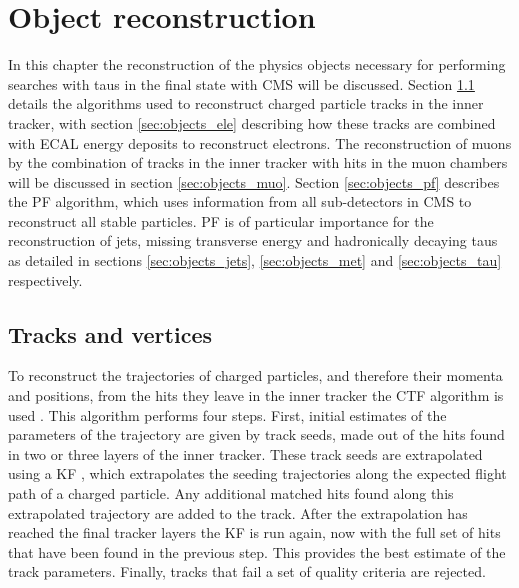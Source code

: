 \chapter{Object reconstruction}
\label{chap:objects}

In this chapter the reconstruction of the physics objects necessary for performing searches with taus 
in the final state with \ac{CMS} will be discussed. Section \ref{sec:objects_pv} details the algorithms
used to reconstruct charged particle tracks in the inner tracker, with section \ref{sec:objects_ele}
describing how these tracks are combined with \ac{ECAL} energy deposits to reconstruct electrons.
The reconstruction of muons by the combination of tracks in the inner tracker with hits in the muon 
chambers will be discussed in section \ref{sec:objects_muo}.
Section \ref{sec:objects_pf}
describes the \ac{PF} algorithm, which uses information from all sub-detectors in \ac{CMS} to reconstruct
all stable particles. \ac{PF} is of particular importance for the reconstruction of jets, missing transverse
energy and hadronically decaying taus as detailed in sections \ref{sec:objects_jets}, \ref{sec:objects_met} and \ref{sec:objects_tau} 
respectively.

\section{Tracks and vertices}
\label{sec:objects_pv}
To reconstruct the trajectories of charged particles, and therefore
their momenta and positions, from the hits they leave in the 
inner tracker the
\ac{CTF} algorithm is used \cite{cms-trk-algos}. This algorithm performs four steps.
First, initial estimates of the parameters of the trajectory are given by track seeds, 
made out of the hits found in two or three layers of the inner tracker. These track seeds
are extrapolated using a \ac{KF} \cite{trk-kf}, which extrapolates the seeding
trajectories along the expected flight path of a charged particle. Any additional
matched hits found along this extrapolated trajectory are added to the track.
After the extrapolation has reached the final tracker layers the \ac{KF} is run again,
now with the full set of hits that have been found in the previous step. This provides the best
estimate of the track parameters. Finally, tracks that fail a set of quality 
criteria are rejected.

